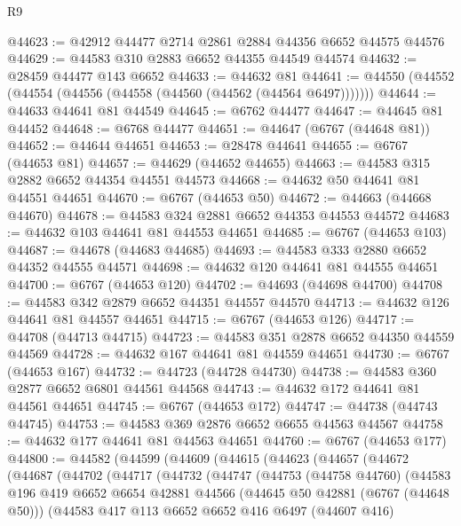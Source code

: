 \begin{lexlean}{R9}
\begin{coremodule}
@44623 := @42912 @44477 @2714 @2861 @2884 @44356 @6652 @44575 @44576
@44629 := @44583 @310 @2883 @6652 @44355 @44549 @44574
@44632 := @28459 @44477 @143 @6652
@44633 := @44632 @81
@44641 := @44550 (@44552 (@44554 (@44556 (@44558 (@44560 (@44562 (@44564 @6497)))))))
@44644 := @44633 @44641 @81 @44549
@44645 := @6762 @44477
@44647 := @44645 @81 @44452
@44648 := @6768 @44477
@44651 := @44647 (@6767 (@44648 @81))
@44652 := @44644 @44651
@44653 := @28478 @44641
@44655 := @6767 (@44653 @81)
@44657 := @44629 (@44652 @44655)
@44663 := @44583 @315 @2882 @6652 @44354 @44551 @44573
@44668 := @44632 @50 @44641 @81 @44551 @44651
@44670 := @6767 (@44653 @50)
@44672 := @44663 (@44668 @44670)
@44678 := @44583 @324 @2881 @6652 @44353 @44553 @44572
@44683 := @44632 @103 @44641 @81 @44553 @44651
@44685 := @6767 (@44653 @103)
@44687 := @44678 (@44683 @44685)
@44693 := @44583 @333 @2880 @6652 @44352 @44555 @44571
@44698 := @44632 @120 @44641 @81 @44555 @44651
@44700 := @6767 (@44653 @120)
@44702 := @44693 (@44698 @44700)
@44708 := @44583 @342 @2879 @6652 @44351 @44557 @44570
@44713 := @44632 @126 @44641 @81 @44557 @44651
@44715 := @6767 (@44653 @126)
@44717 := @44708 (@44713 @44715)
@44723 := @44583 @351 @2878 @6652 @44350 @44559 @44569
@44728 := @44632 @167 @44641 @81 @44559 @44651
@44730 := @6767 (@44653 @167)
@44732 := @44723 (@44728 @44730)
@44738 := @44583 @360 @2877 @6652 @6801 @44561 @44568
@44743 := @44632 @172 @44641 @81 @44561 @44651
@44745 := @6767 (@44653 @172)
@44747 := @44738 (@44743 @44745)
@44753 := @44583 @369 @2876 @6652 @6655 @44563 @44567
@44758 := @44632 @177 @44641 @81 @44563 @44651
@44760 := @6767 (@44653 @177)
@44800 := @44582
    (@44599
      (@44609
        (@44615
          (@44623
            (@44657
              (@44672
                (@44687
                  (@44702
                    (@44717
                      (@44732
                        (@44747
                          (@44753
                            (@44758 @44760)
                            (@44583
                              @196
                              @419
                              @6652
                              @6654
                              @42881
                              @44566
                              (@44645 @50 @42881 (@6767 (@44648 @50)))
                              (@44583
                                @417
                                @113
                                @6652
                                @6652
                                @416
                                @6497
                                (@44607 @416)

\end{coremodule}
\end{lexlean}
